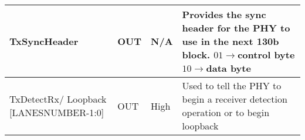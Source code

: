 \begin{table}[H]
\begin{tabular}{ |m{50mm}|P{5mm}|P{5mm}|m{60mm}|  }
TxSyncHeader \newline [2*LANESNUMBER -1:0]
&
OUT
& 
N/A
&

Provides the sync header for
the PHY to use in the next 130b block.
\newline \newline
$ 01 \longrightarrow $control byte \newline
$ 10 \longrightarrow $data byte

\\
\hline


TxDetectRx/ \newline Loopback [LANESNUMBER-1:0]
&
OUT
& 
High
&
Used to tell the PHY to begin a receiver detection
operation or to begin loopback \\
\hline



\end{tabular}

\end{table}


